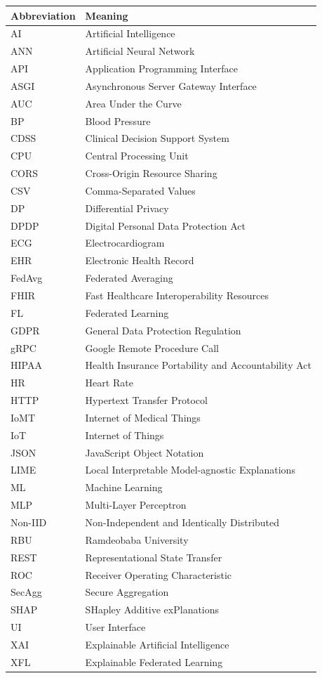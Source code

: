 \documentclass[12pt,a4paper,oneside]{report}
\begin{document}
\begin{table}[H]
\centering
\begin{tabularx}{\textwidth}{p{3.5cm} X}
\toprule
\textbf{Abbreviation} & \textbf{Meaning} \\
\midrule
AI & Artificial Intelligence \\
ANN & Artificial Neural Network \\
API & Application Programming Interface \\
ASGI & Asynchronous Server Gateway Interface \\
AUC & Area Under the Curve \\
BP & Blood Pressure \\
CDSS & Clinical Decision Support System \\
CPU & Central Processing Unit \\
CORS & Cross-Origin Resource Sharing \\
CSV & Comma-Separated Values \\
DP & Differential Privacy \\
DPDP & Digital Personal Data Protection Act \\
ECG & Electrocardiogram \\
EHR & Electronic Health Record \\
FedAvg & Federated Averaging \\
FHIR & Fast Healthcare Interoperability Resources \\
FL & Federated Learning \\
GDPR & General Data Protection Regulation \\
gRPC & Google Remote Procedure Call \\
HIPAA & Health Insurance Portability and Accountability Act \\
HR & Heart Rate \\
HTTP & Hypertext Transfer Protocol \\
IoMT & Internet of Medical Things \\
IoT & Internet of Things \\
JSON & JavaScript Object Notation \\
LIME & Local Interpretable Model-agnostic Explanations \\
ML & Machine Learning \\
MLP & Multi-Layer Perceptron \\
Non-IID & Non-Independent and Identically Distributed \\
RBU & Ramdeobaba University \\
REST & Representational State Transfer \\
ROC & Receiver Operating Characteristic \\
SecAgg & Secure Aggregation \\
SHAP & SHapley Additive exPlanations \\
UI & User Interface \\
XAI & Explainable Artificial Intelligence \\
XFL & Explainable Federated Learning \\
\bottomrule
\end{tabularx}
\end{table}
\end{document}
